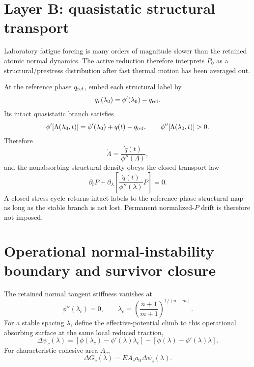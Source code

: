 \documentclass[11pt]{article}
\begin{document}
\section{Layer B: quasistatic structural transport}
Laboratory fatigue forcing is many orders of magnitude slower than the retained atomic normal dynamics. The active reduction therefore interprets $P_0$ as a structural/prestress distribution after fast thermal motion has been averaged out.

At the reference phase $q_{\rm ref}$, embed each structural label by
\begin{equation}
q_r(\lambda_0)=\phi'(\lambda_0)-q_{\rm ref}.
\end{equation}
Its intact quasistatic branch satisfies
\begin{equation}
\phi'[\Lambda(\lambda_0,t)]
=\phi'(\lambda_0)+q(t)-q_{\rm ref},
\qquad
\phi''[\Lambda(\lambda_0,t)]>0.
\label{eq:stablemap}
\end{equation}
Therefore
\begin{equation}
\dot\Lambda=\frac{\dot q(t)}{\phi''(\Lambda)},
\end{equation}
and the nonabsorbing structural density obeys the closed transport law
\begin{equation}
\boxed{
\partial_tP+
\partial_\lambda\left[
\frac{\dot q(t)}{\phi''(\lambda)}P
\right]=0.
}
\label{eq:transport}
\end{equation}
A closed stress cycle returns intact labels to the reference-phase structural map as long as the stable branch is not lost. Permanent normalized-$P$ drift is therefore not imposed.

\section{Operational normal-instability boundary and survivor closure}
The retained normal tangent stiffness vanishes at
\begin{equation}
\phi''(\lambda_c)=0,
\qquad
\lambda_c=\left(\frac{n+1}{m+1}\right)^{1/(n-m)}.
\label{eq:lambdac}
\end{equation}
For a stable spacing $\lambda$, define the effective-potential climb to this operational absorbing surface at the same local reduced traction,
\begin{equation}
\Delta\psi_c(\lambda)
=\left[\phi(\lambda_c)-\phi'(\lambda)\lambda_c\right]
-\left[\phi(\lambda)-\phi'(\lambda)\lambda\right].
\end{equation}
For characteristic cohesive area $A_c$,
\begin{equation}
\Delta G_c(\lambda)=EA_ca_0\Delta\psi_c(\lambda).
\end{equation}
\end{document}
